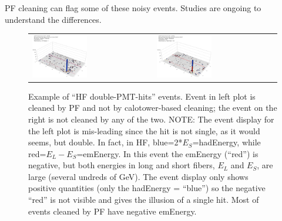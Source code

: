 PF cleaning can flag some of these noisy events. Studies are ongoing to understand the differences.

%
\begin{figure}[h]
 \centering
 \begin{tabular}{ll}
   \includegraphics[width=0.47\textwidth]{fig/HFdoubleHit.eps} &
   \includegraphics[width=0.47\textwidth]{fig/HFdoubleHit_1.eps} \\
 \end{tabular}
\caption{Example of ``HF double-PMT-hits'' events. Event in left plot is cleaned by PF and not by 
calotower-based cleaning; the event on the right is not cleaned by any of the two. 
NOTE: The event display for the left plot is mis-leading since the hit is not single, 
as it would seems, but double. In fact, in HF, blue=2*$E_{S}$=hadEnergy, while red=$E_{L}-E_{S}$=emEnergy. 
In this event the emEnergy (``red'') is negative, but both energies in long and short fibers, $E_{L}$ and $E_{S}$, are large
(several undreds of GeV). The event display only shows positive quantities 
(only the hadEnergy = ``blue'') so the negative ``red'' is not visible and gives the illusion of a single hit. 
Most of events cleaned by PF have negative emEnergy.}
\label{fig:HFdoublehits}
\end{figure}

